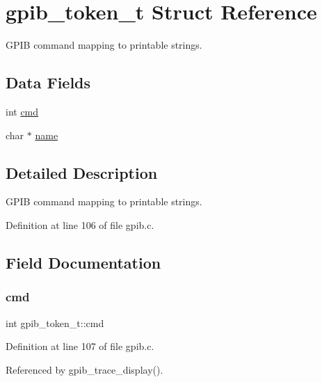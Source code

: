 \hypertarget{structgpib__token__t}{}\section{gpib\+\_\+token\+\_\+t Struct Reference}
\label{structgpib__token__t}


G\+P\+IB command mapping to printable strings.  


\subsection*{Data Fields}
\begin{DoxyCompactItemize}
\item 
int \hyperlink{structgpib__token__t_a8bc698b3cba149e3abbf935e623775c0}{cmd}
\item 
char $\ast$ \hyperlink{structgpib__token__t_aa47fb36b52bd83dc60e67a54f6e36e09}{name}
\end{DoxyCompactItemize}


\subsection{Detailed Description}
G\+P\+IB command mapping to printable strings. 

Definition at line 106 of file gpib.\+c.



\subsection{Field Documentation}
\mbox{\label{structgpib__token__t_a8bc698b3cba149e3abbf935e623775c0}} 
\subsubsection{\texorpdfstring{cmd}{cmd}}
{\footnotesize\ttfamily int gpib\+\_\+token\+\_\+t\+::cmd}



Definition at line 107 of file gpib.\+c.



Referenced by gpib\+\_\+trace\+\_\+display().

\mbox{\label{structgpib__token__t_aa47fb36b52bd83dc60e67a54f6e36e09}} 
